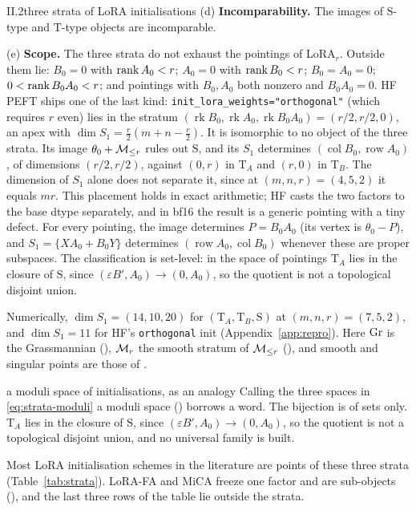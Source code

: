 \begin{theorem}{II.2}{three strata of LoRA initialisations}
(d) \textbf{Incomparability.} The images of $\mathrm S$-type and $\mathrm T$-type objects are incomparable.

(e) \textbf{Scope.} The three strata do not exhaust the pointings of LoRA$_r$. Outside them lie: $B_0=0$ with
$\operatorname{rank} A_0<r$; $A_0=0$ with $\operatorname{rank} B_0<r$; $B_0=A_0=0$; $0<\operatorname{rank} B_0A_0<r$; and pointings with $B_0,A_0$ both nonzero and
$B_0A_0=0$. HF PEFT ships one of the last kind: \texttt{init\_lora\_\allowbreak weights=\allowbreak"orthogonal"} (which requires $r$ even)
lies in the stratum $(\operatorname{rk}B_0,\operatorname{rk}A_0,\operatorname{rk}B_0A_0)=(r/2,r/2,0)$, an apex with
$\dim S_1=\tfrac r2(m+n-\tfrac r2)$. It is isomorphic to no object of the three strata. Its image $\theta_0+\mathcal{M}_{\le r}$ rules
out $\mathrm S$, and its $S_1$ determines $(\operatorname{col}B_0,\operatorname{row}A_0)$, of dimensions $(r/2,r/2)$,
against $(0,r)$ in $\mathrm T_A$ and $(r,0)$ in $\mathrm T_B$. The dimension of $S_1$ alone does not separate it, since
at $(m,n,r)=(4,5,2)$ it equals $mr$. This placement holds in exact arithmetic; HF casts the two factors to the base
dtype separately, and in bf16 the result is a generic pointing with a tiny defect. For every pointing, the image
determines $P=B_0A_0$ (its vertex is $\theta_0-P$), and $S_1=\{XA_0+B_0Y\}$ determines
$(\operatorname{row}A_0,\operatorname{col}B_0)$ whenever these are proper subspaces. The classification is set-level:
in the space of pointings $\mathrm T_A$ lies in the closure of $\mathrm S$, since $(\varepsilon B',A_0)\to(0,A_0)$, so
the quotient is not a topological disjoint union.
\end{theorem}

Numerically, $\dim S_1=(14,10,20)$ for $(\mathrm T_A,\mathrm T_B,\mathrm S)$ at $(m,n,r)=(7,5,2)$, and $\dim S_1=11$
for HF's \texttt{orthogonal} init (Appendix~\ref{app:repro}). Here $\operatorname{Gr}$ is the Grassmannian (), $\mathcal{M}_r$ the
smooth stratum of $\mathcal{M}_{\le r}$ (), and smooth and singular points are those of .

\begin{remark*}{a moduli space of initialisations, as an analogy}
Calling the three spaces in \eqref{eq:strata-moduli} a moduli space () borrows a word. The bijection is of
sets only. $\mathrm T_A$ lies in the closure of $\mathrm S$, since $(\varepsilon B',A_0)\to(0,A_0)$, so the quotient is
not a topological disjoint union, and no universal family is built.
\end{remark*}

Most LoRA initialisation schemes in the literature are points of these three strata (Table~\ref{tab:strata}).
LoRA-FA and MiCA freeze one factor and are sub-objects (), and the last three rows of the table lie outside
the strata.

